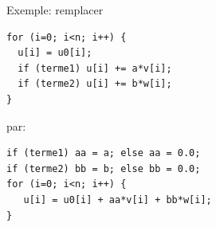 \documentclass{beamer}
\begin{document}
\begin{frame}[fragile]
Exemple: remplacer
\begin{lstlisting}
for (i=0; i<n; i++) {
  u[i] = u0[i];
  if (terme1) u[i] += a*v[i];
  if (terme2) u[i] += b*w[i];
}
\end{lstlisting}

par:
\begin{lstlisting}
if (terme1) aa = a; else aa = 0.0;
if (terme2) bb = b; else bb = 0.0;
for (i=0; i<n; i++) {
   u[i] = u0[i] + aa*v[i] + bb*w[i];
}
\end{lstlisting}

\end{frame}
\end{document}
